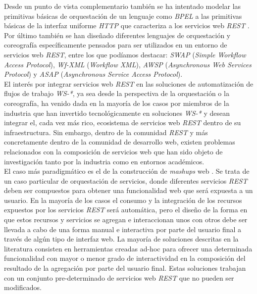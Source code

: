 Desde un punto de vista complementario tambi\'en se ha intentado modelar las primitivas b\'asicas de orquestaci\'on de un lenguaje como \textit{BPEL} a las primitivas b\'asicas de la interfaz uniforme \textit{HTTP} que caracteriza a los servicios web \textit{REST} \cite{pautasso2010restful}.\\
Por \'ultimo tambi\'en se han dise\~nado diferentes lenguajes de orquestaci\'on y coreograf\'ia espec\'ificamente pensados para ser utilizados en un entorno de servicios web \textit{REST}, entre los que pod\'iamos destacar: \textit{SWAP} (\textit{Simple Workflow Access Protocol}), \textit{Wf-XML} (\textit{Workflow XML}), \textit{AWSP} (\textit{Asynchronous Web Services Protocol}) y \textit{ASAP} (\textit{Asynchronous Service Access Protocol})\cite{zur2005developing}.\\
El inter\'es por integrar servicios web \textit{REST} en las soluciones de automatizaci\'on de flujos de trabajo \textit{WS-*}, ya sea desde la perspectiva de la orquestaci\'on o la coreograf\'ia, ha venido dada en la mayor\'ia de los casos por miembros de la industria que han invertido tecnol\'ogicamente en soluciones \textit{WS-*} y desean integrar el, cada vez m\'as rico, ecosistema de servicios web \textit{REST} dentro de su infraestructura. Sin embargo, dentro de la comunidad \textit{REST} y m\'as concretamente dentro de la comunidad de desarrollo web, existen problemas relacionados con la composici\'on de servicios web que han sido objeto de investigaci\'on tanto por la industria como en entornos acad\'emicos.\\
El caso m\'as paradigm\'atico es el de la construcci\'on de \textit{mashups} web \cite{mashups}. Se trata de un caso particular de orquestaci\'on de servicios, donde diferentes servicios \textit{REST} deben ser compuestos para obtener una funcionalidad web que ser\'a expuesta a un usuario. En la mayor\'ia de los casos el consumo y la integraci\'on de los recursos expuestos por los servicios \textit{REST} ser\'a autom\'atica, pero el dise\~no de la forma en que estos recursos y servicios se agregan e interaccionan unos con otros debe ser llevada a cabo de una forma manual e interactiva por parte del usuario final a trav\'es de alg\'un tipo de interfaz web.
La mayor\'ia de soluciones descritas en la literatura consisten en herramientas creadas ad-hoc para ofrecer una determinada funcionalidad con mayor o menor grado de interactividad en la composici\'on del resultado de la agregaci\'on por parte del usuario final. Estas soluciones trabajan con un conjunto pre-determinado de servicios web \textit{REST} que no pueden ser modificados.\\
